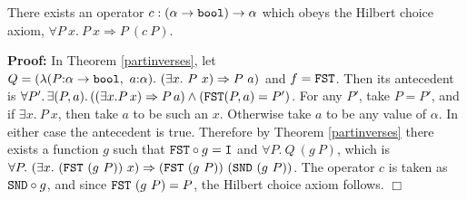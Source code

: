 \documentclass[envcountsame,runningheads]{llncs}
\begin{document}
\begin{theorem}
\label{hilbertchoice}
There exists an operator $c:(\alpha \rightarrow {\tt bool}) \rightarrow \alpha$
which obeys the Hilbert choice axiom,
$\forall P\ x.\ P\ x \Rightarrow P\ (c\ P)$.
\end{theorem}

{\bf Proof:}
In Theorem \ref{partinverses},
let $Q = (\lambda(P{\tt :}\alpha \rightarrow {\tt bool},\ a{\tt :}\alpha).\
                  (\exists x.\ P\ x) \Rightarrow P\ a)$
and $f = {\tt FST}$.  Then its antecedent is
$\forall P'.\, \exists (P,a).\, ((\exists x. P\, x) \Rightarrow P\, a) \wedge ({\tt FST} (P,a) = P')$.
For any $P'$,
take $P = P'$, and
if $\exists x.\ P\ x$,
then take $a$ to be such an $x$.
Otherwise take $a$ to be any value of $\alpha$.
In either case the antecedent is true.
Therefore
by Theorem \ref{partinverses}
there exists a function $g$ such that
${\tt FST} \circ g = {\tt I}$
and
$\forall P.\ Q\ (g\ P)$,
which is
$\forall P.\
(\exists x.\ ({\tt FST}\ (g\ P))\ x) \Rightarrow ({\tt FST}\ (g\ P))\ ({\tt SND}\ (g\ P))$.
The operator $c$ is
taken as ${\tt SND} \circ g$,
and
since ${\tt FST}\ (g\ P) = P$,
the Hilbert choice axiom follows.
$\Box$

\begin{comment}
{\bf Proof:}
In Theorem \ref{partinverses},
take $Q = (\lambda(P{\tt :}\alpha \rightarrow {\tt bool},\ a{\tt :}\alpha).\
                  (\exists x.\ P\ x) \Rightarrow P\ a)$
and $f = {\tt FST}$.  Then its antecedent is
$\forall P.\ \exists (P,a).\ ((\exists x.\ P\ x) \Rightarrow P\ a) \wedge ({\tt FST} (P,a) = P)$.
For any $P$, if $\exists x.\ P\ x$,
then take $a$ to be such an $x$.
Otherwise take $a$ to be any value of $\alpha$.
In either case the antecedent is true.
Therefore there exists a function $g$ such that
${\tt FST} \circ g = {\tt I}$
and
$\forall P.\ {\bf let}\ (P,a) = g\ P\ {\bf in}\ ((\exists x.\ P\ x) \Rightarrow P\ a)$.
The operator $c$ is then taken as ${\tt SND} \circ g$,
and the Hilbert choice axiom follows.
$\Box$
\end{comment}
\end{document}
